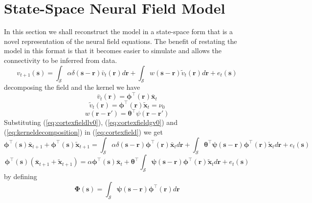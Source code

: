 \documentclass[onecolumn,draftcls]{IEEEtran}
\begin{document}
\section{State-Space Neural Field Model}
In this section we shall reconstruct the model in a state-space form that is a novel representation of the neural field equations. The benefit of restating the model in this format is that it becomes easier to simulate and allows the connectivity to be inferred from data. \begin{equation}
 v_{t+1}(\mathbf s)=\int_{\mathcal S} \alpha \delta(\mathbf s-\mathbf r)\bar v_t(\mathbf r)d \mathbf r+\int_{\mathcal S} w(\mathbf s -\mathbf r)\tilde v_t(\mathbf r)d\mathbf r+e_t(\mathbf s)
\label{eq:cortexfield}
\end{equation}
decomposing the field and the kernel we have
\begin{equation}
\bar v_t(\mathbf r)=\boldsymbol \phi^{\top}(\mathbf r)\bar{\mathbf x}_t
\label{eq:cortexfieldlv0}
\end{equation}
\begin{equation}
\tilde v_t(\mathbf r)=\boldsymbol \phi^{\top}(\mathbf r)\tilde{\mathbf x}_t=\nu_0
\label{eq:cortexfieldgv0}
\end{equation}
\begin{equation}
 w(\mathbf r -\mathbf r')=\boldsymbol \theta^{\top}\psi(\mathbf r -\mathbf r')
\label{eq:kerneldecomposition}
\end{equation}
Substituting (\ref{eq:cortexfieldlv0}), (\ref{eq:cortexfieldgv0}) and (\ref{eq:kerneldecomposition}) in (\ref{eq:cortexfield}) we get
\begin{equation}
 \boldsymbol \phi^{\top}(\mathbf s)\bar{\mathbf x}_{t+1}+\boldsymbol \phi^{\top}(\mathbf s)\tilde{\mathbf x}_{t+1}=
\int_\mathcal{S}\alpha\delta(\mathbf s- \mathbf r)\boldsymbol\phi^{\top}(\mathbf r)\bar{\mathbf x}_td\mathbf r+\int_\mathcal{S}\boldsymbol \theta^{\top}\boldsymbol\psi(\mathbf s -\mathbf r)\boldsymbol\phi^{\top}(\mathbf r)\tilde{\mathbf x}_td\mathbf r+e_t(\mathbf s)
\label{eq:decomposedcortexfield}
\end{equation}
\begin{equation}
 \boldsymbol \phi^{\top}(\mathbf s)(\bar{\mathbf x}_{t+1}+\tilde{\mathbf x}_{t+1})=\alpha \boldsymbol\phi^{\top}(\mathbf s)\bar{\mathbf x}_{t}+\boldsymbol \theta^{\top}\int_{\mathcal S}\boldsymbol\psi(\mathbf s -\mathbf r)\boldsymbol\phi^{\top}(\mathbf r)\tilde{\mathbf x}_td\mathbf r+e_t(\mathbf s)
\end{equation}
by defining
\begin{equation}
 \boldsymbol\Phi(\mathbf s)=\int_{\mathcal S}\boldsymbol\psi(\mathbf s -\mathbf r)\boldsymbol\phi^{\top}(\mathbf r)d\mathbf r
\label{eq:convolution}
\end{equation}
\end{document}
